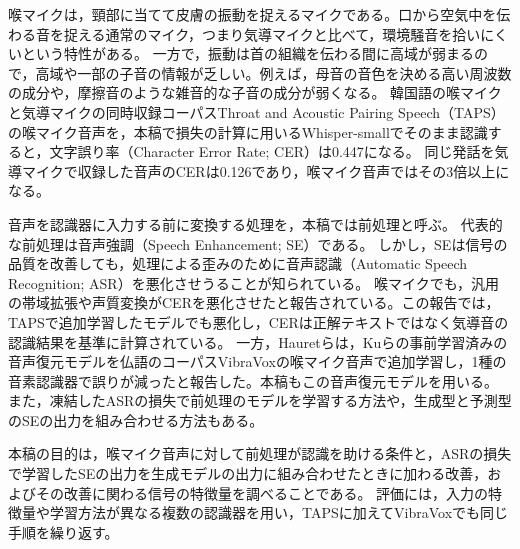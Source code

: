 \documentclass[xelatex,ja=standard,a4paper,twocolumn,10pt]{bxjsarticle}
\makeatletter
\renewcommand{\section}{\@startsection{section}{1}{\z@}{1.0ex plus .3ex}{.5ex}{\normalfont\large\sffamily\bfseries}}
\makeatother
\begin{document}

\section{はじめに}
喉マイクは，頸部に当てて皮膚の振動を捉えるマイクである。口から空気中を伝わる音を捉える通常のマイク，つまり気導マイクと比べて，環境騒音を拾いにくいという特性がある。
一方で，振動は首の組織を伝わる間に高域が弱まるので，高域や一部の子音の情報が乏しい。例えば，母音の音色を決める高い周波数の成分や，摩擦音のような雑音的な子音の成分が弱くなる。
韓国語の喉マイクと気導マイクの同時収録コーパスThroat and Acoustic Pairing Speech（TAPS）\cite{taps}の喉マイク音声を，本稿で損失の計算に用いるWhisper-small\cite{whisper}でそのまま認識すると，文字誤り率（Character Error Rate; CER）は0.447になる。
同じ発話を気導マイクで収録した音声のCERは0.126であり，喉マイク音声ではその3倍以上になる。

音声を認識器に入力する前に変換する処理を，本稿では前処理と呼ぶ。
代表的な前処理は音声強調（Speech Enhancement; SE）である。
しかし，SEは信号の品質を改善しても，処理による歪みのために音声認識（Automatic Speech Recognition; ASR）を悪化させうることが知られている\cite{ochiai2024}。
喉マイクでも，汎用の帯域拡張や声質変換がCERを悪化させたと報告されている\cite{yamanaka2026}。この報告では，TAPSで追加学習したモデルでも悪化し，CERは正解テキストではなく気導音の認識結果を基準に計算されている。
一方，Hauretら\cite{hauret2025rt}は，Kuら\cite{ku2024}の事前学習済みの音声復元モデルを仏語のコーパスVibraVox\cite{vibravox}の喉マイク音声で追加学習し，1種の音素認識器で誤りが減ったと報告した。本稿もこの音声復元モデルを用いる。
また，凍結したASRの損失で前処理のモデルを学習する方法\cite{dissen2024}や，生成型と予測型のSEの出力を組み合わせる方法\cite{shi2024}もある。

本稿の目的は，喉マイク音声に対して前処理が認識を助ける条件と，ASRの損失で学習したSEの出力を生成モデルの出力に組み合わせたときに加わる改善，およびその改善に関わる信号の特徴量を調べることである。
評価には，入力の特徴量や学習方法が異なる複数の認識器を用い，TAPSに加えてVibraVoxでも同じ手順を繰り返す。
\end{document}
